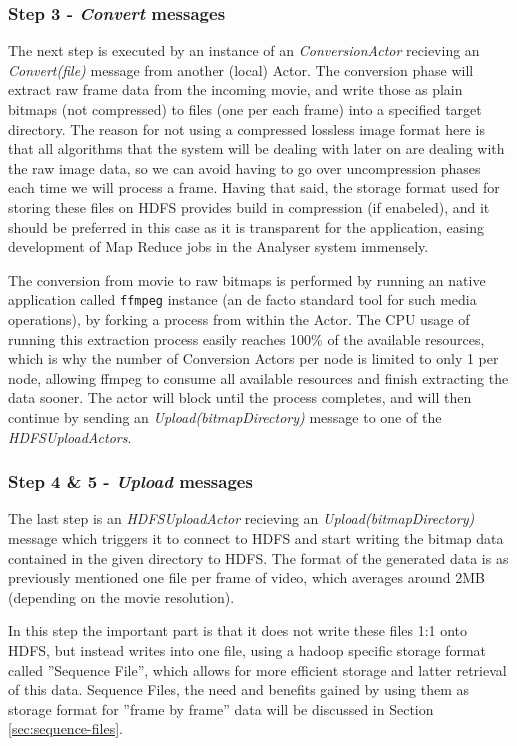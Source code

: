 \subsubsection{Step 3 - \textit{Convert} messages}
The next step is executed by an instance of an \textit{ConversionActor} recieving an \textit{Convert(file)} message from another (local) Actor. The conversion phase will extract raw frame data from the incoming movie, and write those as plain bitmaps (not compressed) to files (one per each frame) into a specified target directory. The reason for not using a compressed lossless image format here is that all algorithms that the system will be dealing with later on are dealing with the raw image data, so we can avoid having to go over uncompression phases each time we will process a frame. Having that said, the storage format used for storing these files on HDFS provides build in compression (if enabeled), and it should be preferred in this case as it is transparent for the application, easing development of Map Reduce jobs in the Analyser system immensely.

The conversion from movie to raw bitmaps is performed by running an native application called \verb|ffmpeg| \cite{ffmpeg} instance (an de facto standard tool for such media operations), by forking a process from within the Actor. The CPU usage of running this extraction process easily reaches 100\% of the available resources, which is why the number of Conversion Actors per node is limited to only 1 per node, allowing ffmpeg to consume all available resources and finish extracting the data sooner. The actor will block until the process completes, and will then continue by sending an \textit{Upload(bitmapDirectory)} message to one of the \textit{HDFSUploadActors}.

\subsubsection{Step 4 \& 5 - \textit{Upload} messages}
The last step is an \textit{HDFSUploadActor} recieving an \textit{Upload(bitmapDirectory)} message which triggers it to connect to HDFS and start writing the bitmap data contained in the given directory to HDFS. The format of the generated data is as previously mentioned one file per frame of video, which averages around 2MB (depending on the movie resolution).

In this step the important part is that it does not write these files 1:1 onto HDFS, but instead writes into one file, using a hadoop specific storage format called ''Sequence File'', which allows for more efficient storage and latter retrieval of this data. Sequence Files, the need and benefits gained by using them as storage format for ''frame by frame'' data will be discussed in Section \ref{sec:sequence-files}.


